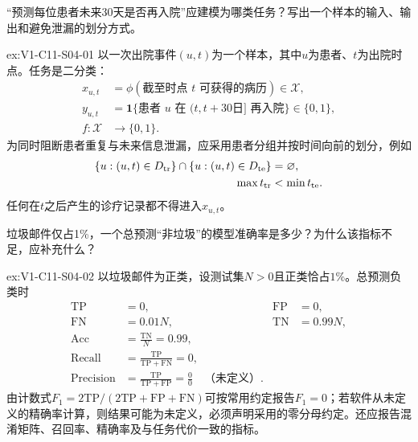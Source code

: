 \begin{SLChapterExercisePairSection}
\begin{exercise}\label{ex:V1-C11-S04-01}
“预测每位患者未来30天是否再入院”应建模为哪类任务？写出一个样本的输入、输出和避免泄漏的划分方式。
\end{exercise}
\label{sol:V1-C11-S04-01}
\begin{chapterexercisesolution}{ex:V1-C11-S04-01}
以一次出院事件$(u,t)$为一个样本，其中$u$为患者、$t$为出院时点。任务是二分类：
\[
\begin{aligned}
x_{u,t}&=\phi(\text{截至时点 }t\text{ 可获得的病历})\in\mathcal X,\\
y_{u,t}&=\mathbf1\{\text{患者 }u\text{ 在 }(t,t+30\text{日}]\text{ 再入院}\}
  \in\{0,1\},\\
f:\mathcal X&\to\{0,1\}.
\end{aligned}
\]
为同时阻断患者重复与未来信息泄漏，应采用患者分组并按时间向前的划分，例如
\[
\begin{aligned}
\{u:(u,t)\in D_{\rm tr}\}\cap
\{u:(u,t)\in D_{\rm te}\}&=\varnothing,\\
\max t_{\rm tr}&<\min t_{\rm te}.
\end{aligned}
\]
任何在$t$之后产生的诊疗记录都不得进入$x_{u,t}$。
\end{chapterexercisesolution}

\begin{exercise}\label{ex:V1-C11-S04-02}
垃圾邮件仅占1\%，一个总预测“非垃圾”的模型准确率是多少？为什么该指标不足，应补充什么？
\end{exercise}
\label{sol:V1-C11-S04-02}
\begin{chapterexercisesolution}{ex:V1-C11-S04-02}
以垃圾邮件为正类，设测试集$N>0$且正类恰占$1\%$。总预测负类时
\[
\begin{aligned}
\mathrm{TP}&=0,&\mathrm{FP}&=0,\\
\mathrm{FN}&=0.01N,&\mathrm{TN}&=0.99N,\\
\mathrm{Acc}
  &=\frac{\mathrm{TN}}{N}=0.99,\\
\mathrm{Recall}
  &=\frac{\mathrm{TP}}{\mathrm{TP}+\mathrm{FN}}=0,\\
\mathrm{Precision}
  &=\frac{\mathrm{TP}}{\mathrm{TP}+\mathrm{FP}}=\frac00
    \quad\text{（未定义）}.
\end{aligned}
\]
由计数式$F_1=2\mathrm{TP}/(2\mathrm{TP}+\mathrm{FP}+\mathrm{FN})$可按常用约定报告$F_1=0$；若软件从未定义的精确率计算，则结果可能为未定义，必须声明采用的零分母约定。还应报告混淆矩阵、召回率、精确率及与任务代价一致的指标。
\end{chapterexercisesolution}


\end{SLChapterExercisePairSection}
